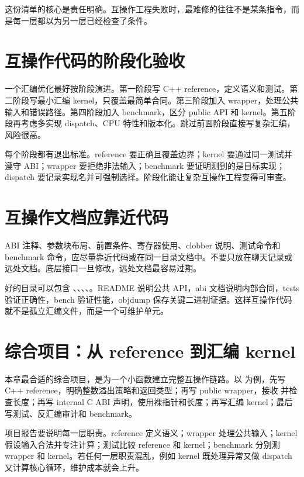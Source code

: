 这份清单的核心是责任明确。互操作工程失败时，最难修的往往不是某条指令，而是每一层都以为另一层已经检查了条件。

\section{互操作代码的阶段化验收}

一个汇编优化最好按阶段演进。第一阶段写 C++ reference，定义语义和测试。第二阶段写最小汇编 kernel，只覆盖最简单合同。第三阶段加入 wrapper，处理公共输入和错误路径。第四阶段加入 benchmark，区分 public API 和 kernel。第五阶段再考虑多实现 dispatch、CPU 特性和版本化。跳过前面阶段直接写复杂汇编，风险很高。

每个阶段都有退出标准。reference 要正确且覆盖边界；kernel 要通过同一测试并遵守 ABI；wrapper 要拒绝非法输入；benchmark 要证明测到的是目标实现；dispatch 要记录实现名并可强制选择。阶段化能让复杂互操作工程变得可审查。

\section{互操作文档应靠近代码}

ABI 注释、参数块布局、前置条件、寄存器使用、clobber 说明、测试命令和 benchmark 命令，应尽量靠近代码或在同一目录文档中。不要只放在聊天记录或远处文档。底层接口一旦修改，远处文档最容易过期。

好的目录可以包含 、、、、。README 说明公共 API，abi 文档说明内部合同，tests 验证正确性，bench 验证性能，objdump 保存关键二进制证据。这样互操作代码就不是孤立汇编文件，而是一个可维护单元。

\section{综合项目：从 reference 到汇编 kernel}

本章最合适的综合项目，是为一个小函数建立完整互操作链路。以  为例，先写 C++ reference，明确整数溢出策略和返回类型；再写 public wrapper，接收  并检查长度；再写 internal C ABI 声明，使用裸指针和长度；再写汇编 kernel；最后写测试、反汇编审计和 benchmark。

项目报告要说明每一层职责。reference 定义语义；wrapper 处理公共输入；kernel 假设输入合法并专注计算；测试比较 reference 和 kernel；benchmark 分别测 wrapper 和 kernel。若任何一层职责混乱，例如 kernel 既处理异常又做 dispatch 又计算核心循环，维护成本就会上升。

